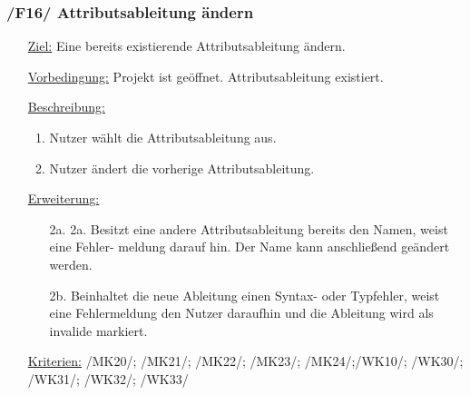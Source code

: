 \documentclass{article}
\begin{document}
\subsubsection*{\textbf{/F16/} Attributsableitung ändern} \label{sec:f:Attributsableitung ändern}
\begin{itemize}
    \item[\underline{Ziel:}] Eine bereits existierende Attributsableitung ändern.
    \item[\underline{Vorbedingung:}] Projekt ist geöffnet. Attributsableitung existiert.
    \item[\underline{Beschreibung:}]
    \begin{enumerate}
        \item Nutzer wählt die Attributsableitung aus.
        \item Nutzer ändert die vorherige Attributsableitung.
    \end{enumerate}
    \item[\underline{Erweiterung:}]
    \begin{itemize}
        \item[2a.] 2a. Besitzt eine andere Attributsableitung bereits den Namen, weist eine Fehler-
        meldung darauf hin. Der Name kann anschließend geändert werden.
        \item[2b.] Beinhaltet die neue Ableitung einen Syntax- oder Typfehler, weist eine Fehlermeldung den Nutzer daraufhin und die Ableitung wird als invalide markiert. 
    \end{itemize}
    \item[\underline{Kriterien:}] /MK20/; /MK21/; /MK22/; /MK23/; /MK24/;\newline/WK10/; /WK30/; /WK31/; /WK32/; /WK33/
\end{itemize}
\end{document}
